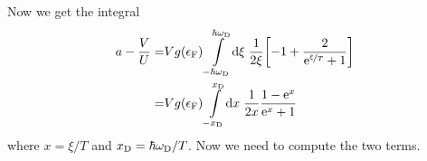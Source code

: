 \documentclass[11pt,letter, swedish, english
]{article}
\newcommand{\Tc}{\ensuremath{T_{\text{c}}}}
\newcommand{\eF}{\ensuremath{\epsilon_{\text{F}}}}
\newcommand{\wD}{\ensuremath{\omega_{\text{D}}}}
\begin{document}

Now we get the integral
\begin{equation}  %
\begin{aligned}\label{eq:2a_a_int}
a-\frac{V}{U}=&
Vg(\eF)\int_{-\hbar\wD}^{\hbar\wD}\!\rd\xi\;
\frac{1}{2\xi}\qty[-1
+\frac{2}{\ee^{\nicefrac{\xi}{T}}+1}]
\\
=&Vg(\eF)\int_{-\xD}^{\xD}\!\rd{x}\;
\frac{1}{2x}\frac{1-\ee^x}{\ee^x+1}
\end{aligned}
\end{equation}
where $x=\xi/T$ and $\xD=\hbar\wD/T$. Now we need to compute the
two terms.

\end{document}
